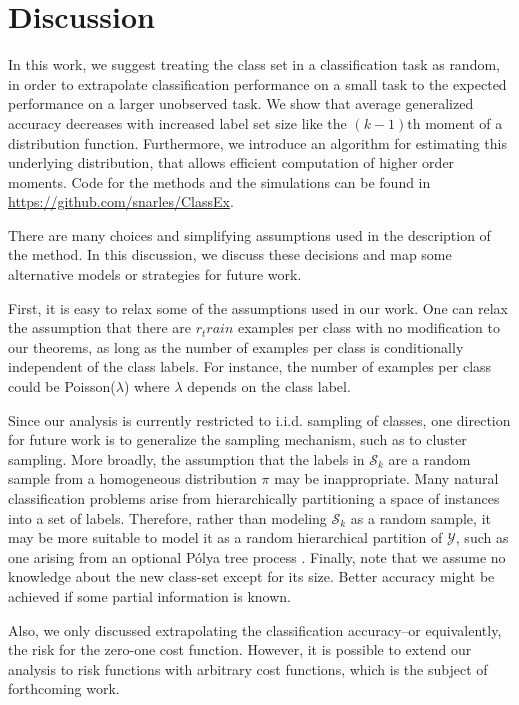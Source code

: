 \documentclass[twoside,11pt]{article}
\begin{document}
\section{Discussion}
\label{sec:discussion}
In this work, we suggest treating the class set in a classification
task as random, in order to extrapolate classification performance on
a small task to the expected performance on a larger unobserved task.
We show that average generalized accuracy decreases with increased
label set size like the $(k-1)$th moment of a distribution function.
Furthermore, we introduce an algorithm for estimating this underlying
distribution, that allows efficient computation of higher order
moments. Code for the methods and the simulations can be found in \url{https://github.com/snarles/ClassEx}.

There are many choices and simplifying assumptions used in
the description of the method.  In this discussion, we discuss these
decisions and map some alternative models or strategies for future
work.



First, it is easy to relax some of the assumptions used in our work.  One can relax the assumption that there are $r_train$ examples per class with no modification to our theorems, as long as the number of examples per class is conditionally independent of the class labels.  For instance, the number of examples per class could be Poisson($\lambda$) where $\lambda$ depends on the class label.  %

Since our analysis is currently restricted to i.i.d. sampling of classes, 
one direction for future work is to generalize the sampling mechanism,
such as to cluster sampling.  More broadly, the assumption that the labels in $\mathcal{S}_k$ are a
random sample from a homogeneous distribution $\pi$ may be inappropriate.  Many
natural classification problems arise from hierarchically partitioning
a space of instances into a set of labels.  Therefore, rather than
modeling $\mathcal{S}_k$ as a random sample, it may be more suitable
to model it as a random hierarchical partition of $\mathcal{Y}$, such as one arising from an optional P{\'o}lya tree process
\citep{wong2010optional}.
Finally, note that we assume no knowledge about the new class-set
except for its size. Better accuracy might be achieved if some partial information 
is known.


Also, we only discussed extrapolating the
classification accuracy--or equivalently, the risk for the zero-one
cost function.  However, it is possible to extend our analysis to risk
functions with arbitrary cost functions, which is the subject of
forthcoming work.
\end{document}
